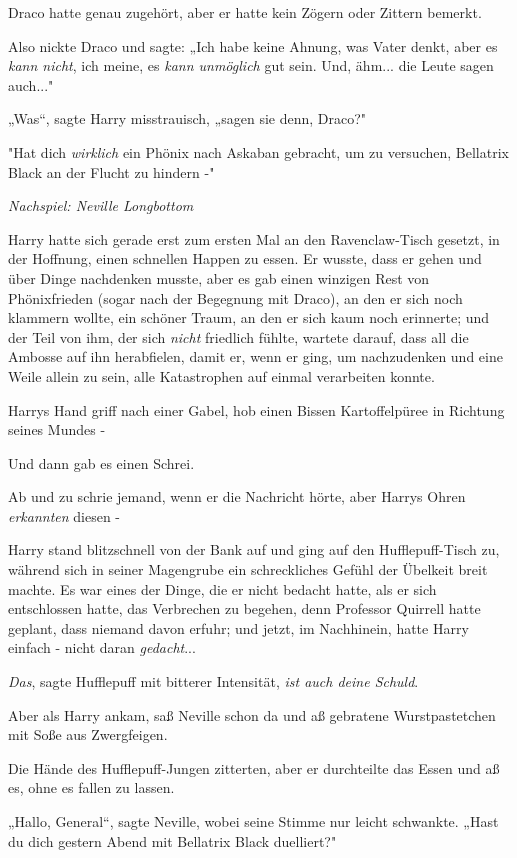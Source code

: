 {Draco hatte genau zugehört, aber er hatte kein Zögern oder Zittern bemerkt.

Also nickte Draco und sagte: „Ich habe keine Ahnung, was Vater denkt, aber es \emph{kann nicht}, ich meine, es \emph{kann unmöglich} gut sein. Und, ähm... die Leute sagen auch..."

„Was“, sagte Harry misstrauisch, „sagen sie denn, Draco?"

"Hat dich \emph{wirklich} ein Phönix nach Askaban gebracht, um zu versuchen, Bellatrix Black an der Flucht zu hindern -"

\emph{\emph{Nachspiel: Neville Longbottom}}

Harry hatte sich gerade erst zum ersten Mal an den Ravenclaw-Tisch gesetzt, in der Hoffnung, einen schnellen Happen zu essen. Er wusste, dass er gehen und über Dinge nachdenken musste, aber es gab einen winzigen Rest von Phönixfrieden (sogar nach der Begegnung mit Draco), an den er sich noch klammern wollte, ein schöner Traum, an den er sich kaum noch erinnerte; und der Teil von ihm, der sich \emph{nicht} friedlich fühlte, wartete darauf, dass all die Ambosse auf ihn herabfielen, damit er, wenn er ging, um nachzudenken und eine Weile allein zu sein, alle Katastrophen auf einmal verarbeiten konnte.

Harrys Hand griff nach einer Gabel, hob einen Bissen Kartoffelpüree in Richtung seines Mundes -

Und dann gab es einen Schrei.

Ab und zu schrie jemand, wenn er die Nachricht hörte, aber Harrys Ohren \emph{erkannten} diesen -

Harry stand blitzschnell von der Bank auf und ging auf den Hufflepuff-Tisch zu, während sich in seiner Magengrube ein schreckliches Gefühl der Übelkeit breit machte. Es war eines der Dinge, die er nicht bedacht hatte, als er sich entschlossen hatte, das Verbrechen zu begehen, denn Professor Quirrell hatte geplant, dass niemand davon erfuhr; und jetzt, im Nachhinein, hatte Harry einfach - nicht daran \emph{gedacht}...

\emph{Das}, sagte Hufflepuff mit bitterer Intensität, \emph{ist auch deine Schuld}.

Aber als Harry ankam, saß Neville schon da und aß gebratene Wurstpastetchen mit Soße aus Zwergfeigen.

Die Hände des Hufflepuff-Jungen zitterten, aber er durchteilte das Essen und aß es, ohne es fallen zu lassen.

„Hallo, General“, sagte Neville, wobei seine Stimme nur leicht schwankte. „Hast du dich gestern Abend mit Bellatrix Black duelliert?"

}
